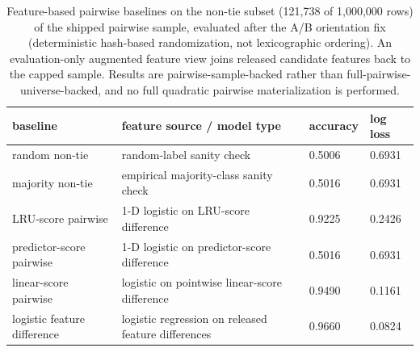 \begin{table}[t]
  \centering
  \footnotesize
  \caption{Feature-based pairwise baselines on the non-tie subset (121,738 of 1,000,000 rows) of the shipped pairwise sample, evaluated after the A/B orientation fix (deterministic hash-based randomization, not lexicographic ordering). An evaluation-only augmented feature view joins released candidate features back to the capped sample. Results are pairwise-sample-backed rather than full-pairwise-universe-backed, and no full quadratic pairwise materialization is performed.}
  \label{tab:pairwise-feature-baselines}
  \begin{tabularx}{\columnwidth}{@{}P{0.24\columnwidth}LP{0.16\columnwidth}P{0.14\columnwidth}@{}}
    \toprule
    baseline & feature source / model type & accuracy & log loss \\
    \midrule
    random non-tie & random-label sanity check & 0.5006 & 0.6931 \\
    majority non-tie & empirical majority-class sanity check & 0.5016 & 0.6931 \\
    LRU-score pairwise & 1-D logistic on LRU-score difference & 0.9225 & 0.2426 \\
    predictor-score pairwise & 1-D logistic on predictor-score difference & 0.5016 & 0.6931 \\
    linear-score pairwise & logistic on pointwise linear-score difference & 0.9490 & 0.1161 \\
    logistic feature difference & logistic regression on released feature differences & 0.9660 & 0.0824 \\
    \bottomrule
  \end{tabularx}
\end{table}
